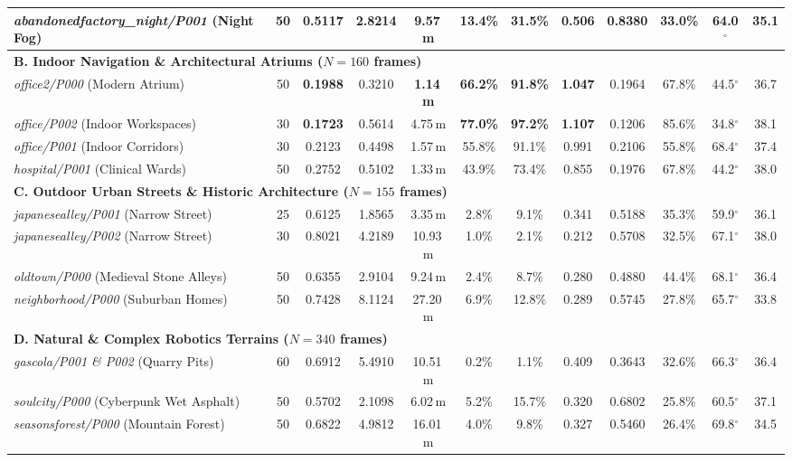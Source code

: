 \begin{table}[t]
{\begin{tabular}{l c cccccc ccc c}
\textit{abandonedfactory\_night/P001} (Night Fog) & 50 & 0.5117 & 2.8214 & 9.57\,m & 13.4\% & 31.5\% & 0.506 & 0.8380 & 33.0\% & 64.0$^\circ$ & 35.1 \\
\midrule
\multicolumn{12}{l}{\textbf{B. Indoor Navigation \& Architectural Atriums ($N=160$ frames)}} \\
\textit{office2/P000} (Modern Atrium) & 50 & \textbf{0.1988} & 0.3210 & \textbf{1.14\,m} & \textbf{66.2\%} & \textbf{91.8\%} & \textbf{1.047} & 0.1964 & 67.8\% & 44.5$^\circ$ & 36.7 \\
\textit{office/P002} (Indoor Workspaces) & 30 & \textbf{0.1723} & 0.5614 & 4.75\,m & \textbf{77.0\%} & \textbf{97.2\%} & \textbf{1.107} & 0.1206 & 85.6\% & 34.8$^\circ$ & 38.1 \\
\textit{office/P001} (Indoor Corridors) & 30 & 0.2123 & 0.4498 & 1.57\,m & 55.8\% & 91.1\% & 0.991 & 0.2106 & 55.8\% & 68.4$^\circ$ & 37.4 \\
\textit{hospital/P001} (Clinical Wards) & 50 & 0.2752 & 0.5102 & 1.33\,m & 43.9\% & 73.4\% & 0.855 & 0.1976 & 67.8\% & 44.2$^\circ$ & 38.0 \\
\midrule
\multicolumn{12}{l}{\textbf{C. Outdoor Urban Streets \& Historic Architecture ($N=155$ frames)}} \\
\textit{japanesealley/P001} (Narrow Street) & 25 & 0.6125 & 1.8565 & 3.35\,m & 2.8\% & 9.1\% & 0.341 & 0.5188 & 35.3\% & 59.9$^\circ$ & 36.1 \\
\textit{japanesealley/P002} (Narrow Street) & 30 & 0.8021 & 4.2189 & 10.93\,m & 1.0\% & 2.1\% & 0.212 & 0.5708 & 32.5\% & 67.1$^\circ$ & 38.0 \\
\textit{oldtown/P000} (Medieval Stone Alleys) & 50 & 0.6355 & 2.9104 & 9.24\,m & 2.4\% & 8.7\% & 0.280 & 0.4880 & 44.4\% & 68.1$^\circ$ & 36.4 \\
\textit{neighborhood/P000} (Suburban Homes) & 50 & 0.7428 & 8.1124 & 27.20\,m & 6.9\% & 12.8\% & 0.289 & 0.5745 & 27.8\% & 65.7$^\circ$ & 33.8 \\
\midrule
\multicolumn{12}{l}{\textbf{D. Natural \& Complex Robotics Terrains ($N=340$ frames)}} \\
\textit{gascola/P001 \& P002} (Quarry Pits) & 60 & 0.6912 & 5.4910 & 10.51\,m & 0.2\% & 1.1\% & 0.409 & 0.3643 & 32.6\% & 66.3$^\circ$ & 36.4 \\
\textit{soulcity/P000} (Cyberpunk Wet Asphalt) & 50 & 0.5702 & 2.1098 & 6.02\,m & 5.2\% & 15.7\% & 0.320 & 0.6802 & 25.8\% & 60.5$^\circ$ & 37.1 \\
\textit{seasonsforest/P000} (Mountain Forest) & 50 & 0.6822 & 4.9812 & 16.01\,m & 4.0\% & 9.8\% & 0.327 & 0.5460 & 26.4\% & 69.8$^\circ$ & 34.5 \\

\end{tabular}}
\end{table}
